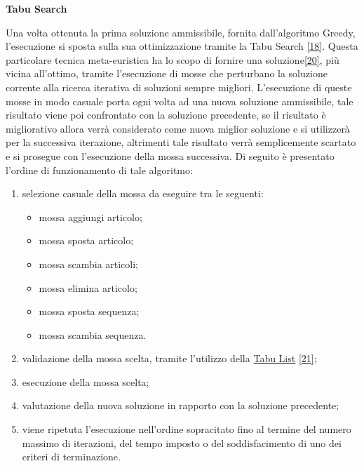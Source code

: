 \textbf{Tabu Search}

Una volta ottenuta la prima soluzione ammissibile, fornita dall'algoritmo Greedy, l'esecuzione si sposta sulla sua ottimizzazione tramite la Tabu Search \hyperref[tabu]{[18]}.
Questa particolare tecnica meta-euristica ha lo scopo di fornire una soluzione\hyperref[scheduling]{[20]}, più vicina all'ottimo, tramite l'esecuzione di mosse che perturbano
la soluzione corrente alla ricerca iterativa di soluzioni sempre migliori. L'esecuzione di queste mosse in modo casuale porta ogni volta ad una nuova soluzione ammissibile, tale risultato viene poi confrontato con la soluzione
precedente, se il risultato è migliorativo allora verrà considerato come nuova miglior soluzione e si utilizzerà per la successiva iterazione, altrimenti tale risultato 
verrà semplicemente scartato e si prosegue con l'esecuzione della mossa successiva. Di seguito è presentato l'ordine di funzionamento di tale algoritmo:
\begin{enumerate}
    \item selezione casuale della mossa da eseguire tra le seguenti:
    \begin{itemize}
        \item mossa aggiungi articolo;
        \item mossa sposta articolo;
        \item mossa scambia articoli;
        \item mossa elimina articolo;
        \item mossa sposta sequenza; 
        \item mossa scambia sequenza.  
    \end{itemize}
    \item validazione della mossa scelta, tramite l'utilizzo della \hyperref[Tabu List]{Tabu List\glo} \hyperref[list]{[21]};
    \item esecuzione della mossa scelta;
    \item valutazione della nuova soluzione in rapporto con la soluzione precedente;
    \item viene ripetuta l'esecuzione nell'ordine sopracitato fino al termine del numero massimo di iterazioni, del tempo imposto o del soddisfacimento di uno dei criteri di
    terminazione.\\
\end{enumerate}


